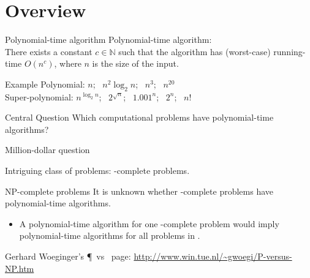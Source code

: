 




\section{Overview}

\begin{frame}
	\begin{block}{Polynomial-time algorithm}
		Polynomial-time algorithm:\\
		There exists a constant $c\in \mathbb{N}$ such that the algorithm has (worst-case) running-time $O(n^c)$, where $n$ is the size of the input.
	\end{block}

	\pause
	\begin{block}{Example}
		Polynomial: $n$; ~$n^2 \log_2 n$; ~$n^3$; ~$n^{20}$\\
		Super-polynomial: $n^{\log_2 n}$; ~$2^{\sqrt{n}}$; ~$1.001^n$; ~$2^n$; ~$n!$
	\end{block}

\end{frame}


\begin{frame}

	\begin{block}{Central Question}
		Which computational problems have polynomial-time algorithms?
	\end{block}

\end{frame}

\begin{frame}{Million-dollar question}

	Intriguing class of problems: \NP-complete problems.

	\begin{block}{NP-complete problems}
		It is unknown whether \NP-complete problems have polynomial-time algorithms.
		\begin{itemize}
			\item A polynomial-time algorithm for one \NP-complete problem would imply polynomial-time algorithms for all problems in \NP.
		\end{itemize}
	\end{block}

	Gerhard Woeginger's \P\ vs \NP\ page: \url{http://www.win.tue.nl/~gwoegi/P-versus-NP.htm}

\end{frame}


